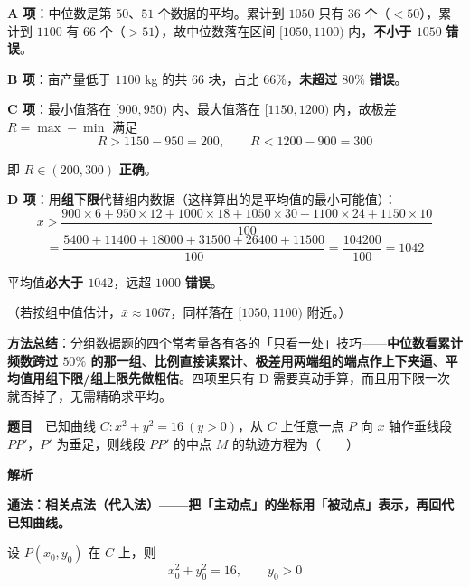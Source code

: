 \par\medskip

\textbf{A 项}：中位数是第 $50$、$51$ 个数据的平均。累计到 $1050$ 只有 $36$ 个（$<50$），累计到 $1100$ 有 $66$ 个（$>51$），故中位数落在区间 $[1050,1100)$ 内，\textbf{不小于 $1050$}  \textbf{错误}。

\par\medskip

\textbf{B 项}：亩产量低于 $1100$ kg 的共 $66$ 块，占比 $66\%$，\textbf{未超过 $80\%$}  \textbf{错误}。

\par\medskip

\textbf{C 项}：最小值落在 $[900,950)$ 内、最大值落在 $[1150,1200)$ 内，故极差 $R=\max-\min$ 满足
\[R>1150-950=200,\qquad R<1200-900=300\]

即 $R\in(200,300)$  \textbf{正确}。

\par\medskip

\textbf{D 项}：用\textbf{组下限}代替组内数据（这样算出的是平均值的最小可能值）：
\[\bar x>\frac{900\times6+950\times12+1000\times18+1050\times30+1100\times24+1150\times10}{100}\]
\[=\frac{5400+11400+18000+31500+26400+11500}{100}=\frac{104200}{100}=1042\]

平均值\textbf{必大于 $1042$}，远超 $1000$  \textbf{错误}。

（若按组中值估计，$\bar x\approx1067$，同样落在 $[1050,1100)$ 附近。）


\begin{gktip}
\textbf{方法总结}：分组数据题的四个常考量各有各的「只看一处」技巧——\textbf{中位数看累计频数跨过 $50\%$ 的那一组}、\textbf{比例直接读累计}、\textbf{极差用两端组的端点作上下夹逼}、\textbf{平均值用组下限/组上限先做粗估}。四项里只有 D 需要真动手算，而且用下限一次就否掉了，无需精确求平均。
\end{gktip}

\par\medskip


\textbf{题目}　已知曲线 $C:x^{2}+y^{2}=16\ (y>0)$，从 $C$ 上任意一点 $P$ 向 $x$ 轴作垂线段 $PP'$，$P'$ 为垂足，则线段 $PP'$ 的中点 $M$ 的轨迹方程为（　　）

\textbf{解析}

\textbf{通法：相关点法（代入法）——把「主动点」的坐标用「被动点」表示，再回代已知曲线。}

设 $P\left(x_0,y_0\right)$ 在 $C$ 上，则
\[x_0^{2}+y_0^{2}=16,\qquad y_0>0\]


